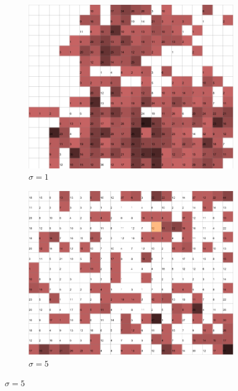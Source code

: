 \documentclass{acm_proc_article-sp}
\begin{document}
\begin{figure}
\centering
    \centering
    \begin{subfigure}[b]{0.30\linewidth}
        \includegraphics[width=\linewidth]{img/wine-newmid-topographic-error-sigma-1}
        \caption{$\sigma=1$}
        \label{fig:wine-newmid-topographic-error-sigma-1}
    \end{subfigure}
    \begin{subfigure}[b]{0.30\linewidth}
        \includegraphics[width=\linewidth]{img/wine-newmid-topographic-error-sigma-5}
        \caption{$\sigma=5$}
        \label{fig:wine-newmid-topographic-error-sigma-5}

\end{subfigure}
\end{figure}
\end{document}
